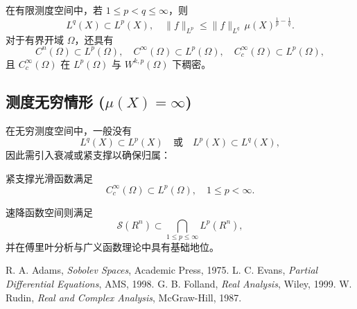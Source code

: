 \documentclass[12pt,a4paper]{article}
\newcommand{\R}{\mathbb{R}}                %
\def\R{R}%
\theoremstyle{plain}
\theoremstyle{definition}
\theoremstyle{remark}
\begin{document}
在有限测度空间中，若 $1\leq p<q\le\infty$，则
\[
L^q(X)\subset L^p(X),\quad
\|f\|_{L^p}\le\|f\|_{L^q}\,\mu(X)^{\tfrac1p-\tfrac1q}.
\]
对于有界开域 $\Omega$，还具有
\[
C^n(\Omega)\subset L^p(\Omega),\quad
C^\infty(\Omega)\subset L^p(\Omega),\quad
C_c^\infty(\Omega)\subset L^p(\Omega),
\]
且 $C_c^\infty(\Omega)$ 在 $L^p(\Omega)$ 与 $W^{k,p}(\Omega)$ 下稠密。

\subsection{测度无穷情形 ($\mu(X)=\infty$)}

在无穷测度空间中，一般没有
\[
L^q(X)\subset L^p(X)\quad\text{或}\quad L^p(X)\subset L^q(X),
\]
因此需引入衰减或紧支撑以确保归属：

紧支撑光滑函数满足
\[
C_c^\infty(\Omega)\subset L^p(\Omega),\quad 1\le p<\infty.
\]

速降函数空间则满足
\[
\mathcal S(\R^n)\subset \bigcap_{1\le p\le\infty}L^p(\R^n),
\]
并在傅里叶分析与广义函数理论中具有基础地位。

\begin{thebibliography}{9}
 R. A. Adams, \textit{Sobolev Spaces}, Academic Press, 1975.
 L. C. Evans, \textit{Partial Differential Equations}, AMS, 1998.
 G. B. Folland, \textit{Real Analysis}, Wiley, 1999.
 W. Rudin, \textit{Real and Complex Analysis}, McGraw-Hill, 1987.
\end{thebibliography}
\end{document}
